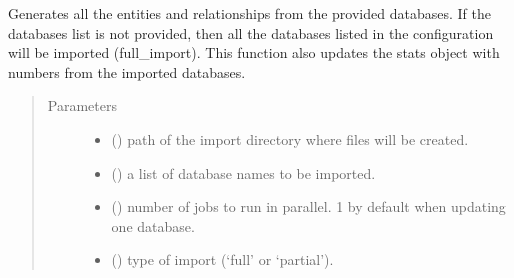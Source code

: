 \documentclass[letterpaper,10pt,english]{sphinxmanual}
\begin{document}

\begin{fulllineitems}
\label{\detokenize{_autosummary/graphdb_builder.builder:graphdb_builder.builder.importer.databasesImport}}
Generates all the entities and relationships from the provided databases. If the databases list is    not provided, then all the databases listed in the configuration will be imported (full\_import).    This function also updates the stats object with numbers from the imported databases.
\begin{quote}\begin{description}
\item[{Parameters}] \leavevmode\begin{itemize}
\item {} 
 () \textendash{} path of the import directory where files will be created.

\item {} 
 () \textendash{} a list of database names to be imported.

\item {} 
 () \textendash{} number of jobs to run in parallel. 1 by default when updating one database.

\item {} 
 () \textendash{} type of import (‘full’ or ‘partial’).

\end{itemize}

\end{description}\end{quote}

\end{fulllineitems}
\end{document}
